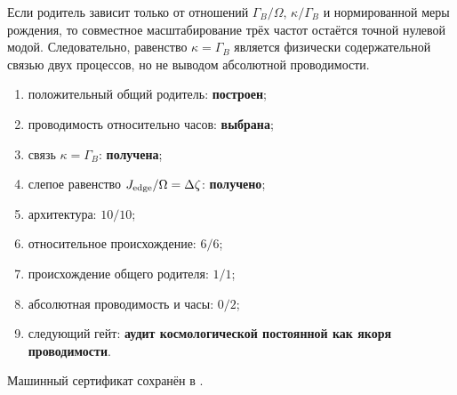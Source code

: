\begin{nogocriterion}
Если родитель зависит только от отношений
$\Gamma_B/\Omega$, $\kappa/\Gamma_B$ и нормированной меры рождения, то
совместное масштабирование трёх частот остаётся точной нулевой модой.
Следовательно, равенство $\kappa=\Gamma_B$ является физически содержательной
связью двух процессов, но не выводом абсолютной проводимости.
\end{nogocriterion}

\begin{protocol}\begin{enumerate}\raggedright
\item положительный общий родитель: \textbf{построен};
\item проводимость относительно часов: \textbf{выбрана};
\item связь $\kappa=\Gamma_B$: \textbf{получена};
\item слепое равенство $J_{\rm edge}/\Omega=\Delta\zeta$: \textbf{получено};
\item архитектура: \textbf{$10/10$};
\item относительное происхождение: \textbf{$6/6$};
\item происхождение общего родителя: \textbf{$1/1$};
\item абсолютная проводимость и часы: \textbf{$0/2$};
\item следующий гейт: \textbf{аудит космологической постоянной как якоря
проводимости}.
\end{enumerate}\end{protocol}

Машинный сертификат сохранён в
.